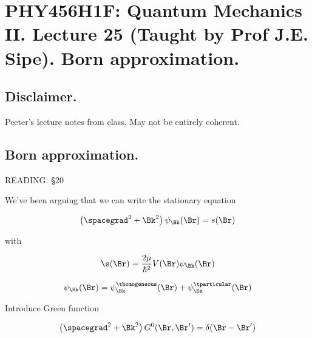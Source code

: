 
%


\chapter{PHY456H1F: Quantum Mechanics II.  Lecture 25 (Taught by Prof J.E. Sipe).  Born approximation.}
\label{chap:qmTwoL25}
\date{Dec 7, 2011}

\beginArtWithToc

\section{Disclaimer.}

Peeter's lecture notes from class.  May not be entirely coherent.

\section{Born approximation.}

READING: \S 20 \cite{desai2009quantum}

We've been arguing that we can write the stationary equation 

\begin{equation}\label{eqn:qmTwoL25:n}
\left( \spacegrad^2 + \Bk^2\right) \psi_\Bk(\Br) = s(\Br)
\end{equation}

with 

\begin{equation}\label{eqn:qmTwoL25:n}
\s(\Br) = \frac{2\mu}{\hbar^2} V(\Br) \psi_\Bk(\Br)
\end{equation}

\begin{equation}\label{eqn:qmTwoL25:n}
\psi_\Bk(\Br) = \psi_\Bk^\thomogeneous(\Br) + \psi_\Bk^\tparticular(\Br)
\end{equation}

Introduce Green function

\begin{equation}\label{eqn:qmTwoL25:n}
\left( \spacegrad^2 + \Bk^2\right) G^0(\Br, \Br') = \delta(\Br- \Br')
\end{equation}


